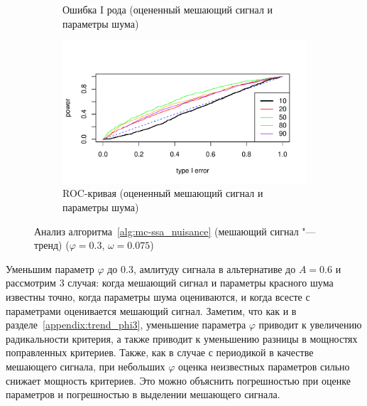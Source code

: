 \documentclass[specialist,
substylefile = spbu_report.rtx,
subf,href,colorlinks=true, 12pt]{disser}
\theoremstyle{definition}
\begin{document}
\begin{figure}[h!]
\begin{subfigure}[t]{0.5\textwidth}
		\caption{Ошибка I рода (оцененный мешающий сигнал и параметры шума)}
		\label{fig:type1error_trend_phi3est_signal}
	\end{subfigure}\hspace{\fill}
	\begin{subfigure}[t]{0.5\textwidth}
		\centering
		\includegraphics[width=\textwidth]{img/roc_trend_phi3est_signal.pdf}
		\caption{ROC-кривая (оцененный мешающий сигнал и параметры шума)}
		\label{fig:roc_trend_phi3est_signal}
	\end{subfigure}
	\caption{Анализ алгоритма~\ref{alg:mc-ssa_nuisance} (мешающий сигнал "--- тренд) ($\varphi=0.3$, $\omega=0.075$)}
\label{fig:trend_phi3}
\end{figure}

Уменьшим параметр $\varphi$ до $0.3$, амлитуду сигнала в альтернативе до $A=0.6$ и рассмотрим $3$ случая: когда мешающий сигнал и параметры красного шума известны точно, когда параметры шума оцениваются, и когда всесте с параметрами оценивается мешающий сигнал. Заметим, что как и в разделе~\ref{appendix:trend_phi3}, уменьшение параметра $\varphi$ приводит к увеличению радикальности критерия, а также приводит к уменьшению разницы в мощностях поправленных критериев. Также, как в случае с периодикой в качестве мешающего сигнала, при небольших $\varphi$ оценка неизвестных параметров сильно снижает мощность критериев. Это можно объяснить погрешностью при оценке параметров и погрешностью в выделении мешающего сигнала.
\end{document}
